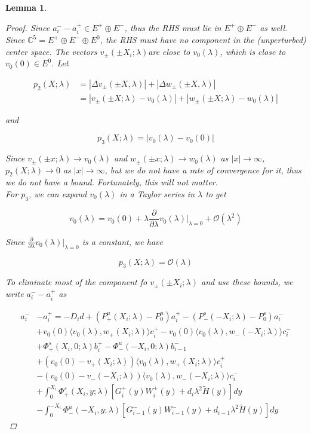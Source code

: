 \documentclass[12pt]{article}
\def\C{{\mathbb C}}
\newtheorem{lemma}{Lemma}
\begin{document}
\begin{lemma}
\begin{proof}
Since $a_i^- - a_i^+ \in E^+ \oplus E^-$, thus the RHS must lie in $E^+ \oplus E^-$ as well. Since $\C^5 = E^+ \oplus E^- \oplus E^0$, the RHS must have no component in the (unperturbed) center space. The vectors $v_\pm(\pm X_i; \lambda)$are close to $v_0(\lambda)$, which is close to $v_0(0) \in E^0$. Let

\begin{align*}
p_2(X; \lambda) &= |\Delta v_\pm(\pm X, \lambda)| + |\Delta w_\pm(\pm X, \lambda)|\\
&= |v_\pm(\pm X; \lambda) - v_0(\lambda)| + |w_\pm(\pm X; \lambda) - w_0(\lambda)|
\end{align*}

and

\[
p_3(X; \lambda) = |v_0(\lambda) - v_0(0)| 
\]

Since $v_\pm(\pm x; \lambda) \rightarrow v_0(\lambda)$ and $w_\pm(\pm x; \lambda) \rightarrow w_0(\lambda)$ as $|x| \rightarrow \infty$, $p_2(X; \lambda) \rightarrow 0$ as $|x| \rightarrow \infty$, but we do not have a rate of convergence for it, thus we do not have a bound. Fortunately, this will not matter.\\

For $p_3$, we can expand $v_0(\lambda)$ in a Taylor series in $\lambda$ to get

\[
v_0(\lambda) = v_0(0) + \lambda \frac{\partial}{\partial \lambda}v_0(\lambda)\Big|_{\lambda = 0} + \mathcal{O}(\lambda^2)
\]

Since $\frac{\partial}{\partial \lambda}v_0(\lambda)\Big|_{\lambda = 0}$ is a constant, we have

\[
p_3(X; \lambda) = \mathcal{O}(\lambda) 
\]

To eliminate most of the component fo $v_\pm(\pm X_i; \lambda)$ and use these bounds, we write $a_i^- - a_i^+$ as

\begin{align*}
a_i^- &- a_i^+ = -D_i d + (P^u_+(X_i; \lambda) - P_0^u)a_i^+ - (P^s_-(-X_i; \lambda) - P_0^s)a_i^- \\
&+ v_0(0) \langle v_0(\lambda), w_+(X_i; \lambda) \rangle c_i^+ 
- v_0(0) \langle v_0(\lambda), w_-(-X_i; \lambda) \rangle c_i^- \\
&+ \Phi^s_+(X_i, 0; \lambda)b_i^+ - \Phi^u_-(-X_i, 0; \lambda)b_{i-1}^- \\
&+ (v_0(0) - v_+(X_i; \lambda)) \langle v_0(\lambda), w_+(X_i; \lambda) \rangle c_i^+ \\
&- (v_0(0) - v_-(-X_i; \lambda)) \langle v_0(\lambda), w_-(-X_i; \lambda) \rangle c_i^- \\
&+ \int_0^{X_i} \Phi^s_+(X_i, y; \lambda) [ G_i^+(y) W_i^+(y) + d_i \lambda^2 \tilde{H}(y) ] dy \\
&- \int_0^{-X_i} \Phi^u_-(-X_i, y; \lambda) [ G_{i-1}^-(y) W_{i-1}^-(y) + d_{i-1} \lambda^2 \tilde{H}(y) ] dy
\end{align*}


\end{proof}
\end{lemma}
\end{document}
